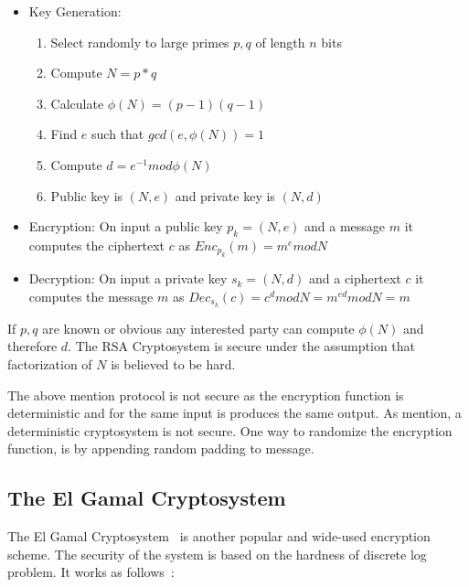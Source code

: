 \begin{itemize}
  \item Key Generation:
    \begin{enumerate}
      \item Select randomly to large primes $p, q$ of length $n$ bits
      \item Compute $N = p*q$
      \item Calculate $\phi(N) = (p - 1)(q - 1)$
      \item Find $e$ such that $gcd(e, \phi(N)) = 1$
      \item Compute $d = e^{-1} mod\phi(N)$
      \item Public key is $(N, e)$ and private key is $(N, d)$
    \end{enumerate}
  \item Encryption: On input a public key $p_k = (N, e)$ and a message $m$ it computes the ciphertext $c$ as $ Enc_{p_k}(m) = m^{e}modN$
  \item Decryption: On input a private key $s_k = (N, d)$ and a ciphertext $c$ it computes the message $m$ as $ Dec_{s_k}(c) = c^{d}modN = m^{ed}modN = m$
\end{itemize}

If $p, q$ are known or obvious any interested party can compute $\phi(N)$ and therefore $d$. The RSA Cryptosystem is secure under the assumption that factorization of $N$ is believed to be hard.

The above mention protocol is not secure as the encryption function is deterministic and for the same input is produces the same output. As mention, a deterministic cryptosystem is not secure. One way to randomize the encryption function, is by appending random padding to message.

\subsection{The El Gamal Cryptosystem}
\label{preliminaries:pub:el_gamal}

The El Gamal Cryptosystem~\cite{el_gamal} is another popular and wide-used encryption scheme. The security of the system is based on the hardness of discrete log problem. It works as follows~\cite{Katz:2014:IMC:2700550, kiagias:crypto}:

